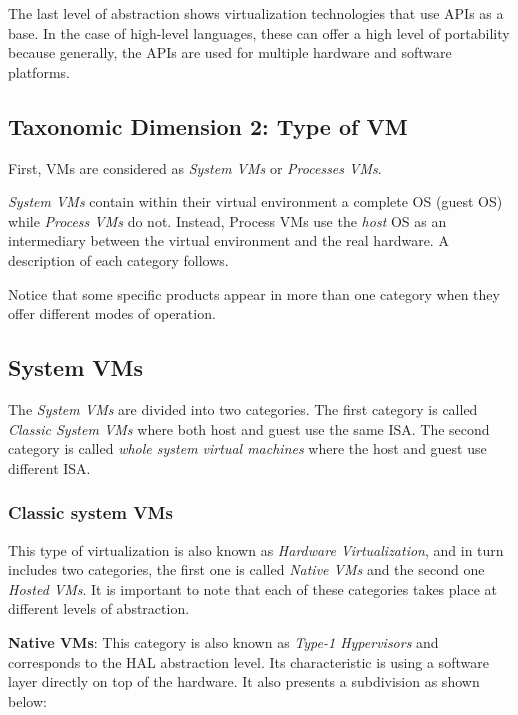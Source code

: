 	The last level of abstraction shows virtualization technologies that use APIs as a base. In the case of high-level languages, these can offer a high level of portability because generally, the APIs are used for multiple hardware and software platforms.
	
	\subsection{Taxonomic Dimension 2: Type of VM}
	
	First, VMs are considered as \textit{System VMs} or \textit{ Processes VMs}. 
	
	
 \textit{System VMs} contain within their virtual environment a complete OS (guest OS) while \textit{Process VMs} do not. Instead, Process VMs use the \textit{host} OS as an intermediary between the virtual environment and the real hardware. A description of each category follows.
 
 Notice that some specific products appear in more than one category when they offer different modes of operation.
	
	\subsection{System VMs}
	
	The \textit{System VMs} are divided into two categories.  The first category is called \textit{Classic System VMs} where both host and guest use the same ISA. The second category is called \textit{whole system virtual machines} where the host and guest use different ISA.
	
	\subsubsection{Classic system VMs} This type of virtualization is also known as \textit{Hardware Virtualization}, and in turn includes two categories, the first one is called \textit{Native VMs} and the second one \textit{Hosted VMs}. It is important to note that each of these categories takes place at different levels of abstraction.
	
	\textbf{Native VMs}: This category is also known as \textit{Type-1 Hypervisors} and corresponds to the HAL abstraction level. Its characteristic is using a software layer directly on top of the hardware. It also presents a subdivision as shown below:
		

